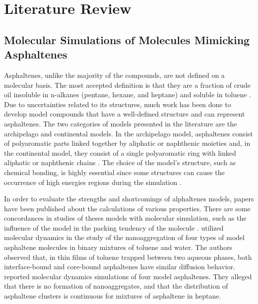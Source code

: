 
\chapter{Literature Review} %
\label{Chapter2} %
\section{Molecular Simulations of Molecules Mimicking Asphaltenes}

Asphaltenes, unlike the majority of the compounds, are not defined on a molecular basis. The most accepted definition is that they are a fraction of crude oil insoluble in n-alkanes (pentane, hexane, and heptane) and soluble in toluene \cite{SJOBLOM2003399}. Due to uncertainties related to its structures, much work has been done to develop model compounds that have a well-defined structure and can represent asphaltenes. The two categories of models presented in the literature are the archipelago and continental models. In the archipelago model, asphaltenes consist of polyaromatic parts linked together by aliphatic or naphthenic moieties and, in the continental model, they consist of a single
polyaromatic ring with linked aliphatic or naphthenic chains \cite{doi:10.1021/ef900975e,doi:10.1080/0892702031000148762}. The choice of the model's structure, such as chemical bonding, is highly essential since some structures can cause the occurrence of high energies regions during the simulation \cite{doi:10.1021/ef200507c} .   

In order to evaluate the strengths and shortcomings of alphaltenes models, papers have been published about the calculations of various properties. There are some concordances in studies of theses models with molecular simulation, such as the influence of the model in the packing tendency of the molecule \cite{doi:10.1080/10298436.2011.575141}.  utilized molecular dynamics in the study of the nanoaggregation of four types of model asphaltene molecules in binary mixtures of toluene and water. The authors observed that, in thin films of toluene trapped between two aqueous phases, both interface-bound and core-bound asphaltenes have similar diffusion behavior.  reported molecular dynamics simulations of four model asphaltenes. They alleged that there is no formation of nanoaggregates, and that the distribution of asphaltene clusters is continuous for mixtures of asphaltene in heptane. 

